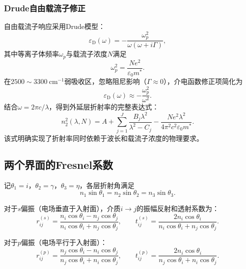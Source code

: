 \documentclass[12pt,a4paper]{ctexart}
\begin{document}
	\subsubsection{Drude自由载流子修正}
	自由载流子响应采用Drude模型：
	\begin{equation}
		\varepsilon_{\mathrm D}(\omega) = -\frac{\omega_p^2}{\omega(\omega + i\Gamma)},
		\label{eq:drude_complex}
	\end{equation}
	其中等离子体频率$\omega_p$与载流子浓度$N$满足
	\begin{equation}
		\omega_p^2 = \frac{Ne^2}{\varepsilon_0 m^*}.
		\label{eq:plasma}
	\end{equation}
	在$2500\sim3300\ \mathrm{cm^{-1}}$弱吸收区，忽略阻尼影响（$\Gamma\approx 0$），介电函数修正项简化为
	\begin{equation}
		\varepsilon_{\mathrm D}(\omega) \approx -\frac{\omega_p^2}{\omega^2}.
	\end{equation}
	结合$\omega = 2\pi c/\lambda$，得到外延层折射率的完整表达式：
	\begin{equation}
		n_2^2(\lambda,N) = A + \sum_{j=1}^{J} \frac{B_j\lambda^2}{\lambda^2 - C_j} - \frac{Ne^2\lambda^2}{4\pi^2 c^2 \varepsilon_0 m^*}.
		\label{eq:n2_lambda_N}
	\end{equation}
	该式明确实现了折射率同时依赖于波长和载流子浓度的物理要求。
	
	\subsection{两个界面的Fresnel系数}
	记$\theta_1=i$，$\theta_2=\gamma$，$\theta_3=\eta$，各层折射角满足
	\begin{equation}
		n_1\sin\theta_1 = n_2\sin\theta_2 = n_3\sin\theta_3.
	\end{equation}
	
	对于$s$偏振（电场垂直于入射面），介质$i\to j$的振幅反射和透射系数为：
	\begin{equation}
		r_{ij}^{(s)} = \frac{n_i\cos\theta_i - n_j\cos\theta_j}{n_i\cos\theta_i + n_j\cos\theta_j},\qquad
		t_{ij}^{(s)} = \frac{2n_i\cos\theta_i}{n_i\cos\theta_i + n_j\cos\theta_j}.
		\label{eq:fresnel_s}
	\end{equation}
	
	对于$p$偏振（电场平行于入射面）：
	\begin{equation}
		r_{ij}^{(p)} = \frac{n_j\cos\theta_i - n_i\cos\theta_j}{n_j\cos\theta_i + n_i\cos\theta_j},\qquad
		t_{ij}^{(p)} = \frac{2n_i\cos\theta_i}{n_j\cos\theta_i + n_i\cos\theta_j}.
		\label{eq:fresnel_p}
	\end{equation}
	
\end{document}

